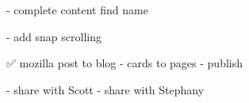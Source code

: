 - complete content
 find name 

 - add snap scrolling
 
 ✅ mozilla post to blog 
- cards to pages
- publish 

- share with Scott
- share with Stephany